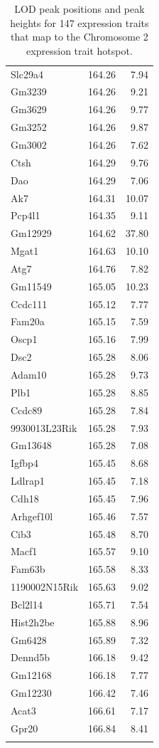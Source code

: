 \documentclass{article}
\begin{document}
\begin{longtable}{lrr}
  Slc29a4 & 164.26 & 7.94 \\ 
  Gm3239 & 164.26 & 9.21 \\ 
  Gm3629 & 164.26 & 9.77 \\ 
  Gm3252 & 164.26 & 9.87 \\ 
  Gm3002 & 164.26 & 7.62 \\ 
  Ctsh & 164.29 & 9.76 \\ 
  Dao & 164.29 & 7.06 \\ 
  Ak7 & 164.31 & 10.07 \\ 
  Pcp4l1 & 164.35 & 9.11 \\ 
  Gm12929 & 164.62 & 37.80 \\ 
  Mgat1 & 164.63 & 10.10 \\ 
  Atg7 & 164.76 & 7.82 \\ 
  Gm11549 & 165.05 & 10.23 \\ 
  Ccdc111 & 165.12 & 7.77 \\ 
  Fam20a & 165.15 & 7.59 \\ 
  Oscp1 & 165.16 & 7.99 \\ 
  Dsc2 & 165.28 & 8.06 \\ 
  Adam10 & 165.28 & 9.73 \\ 
  Plb1 & 165.28 & 8.85 \\ 
  Ccdc89 & 165.28 & 7.84 \\ 
  9930013L23Rik & 165.28 & 7.93 \\ 
  Gm13648 & 165.28 & 7.08 \\ 
  Igfbp4 & 165.45 & 8.68 \\ 
  Ldlrap1 & 165.45 & 7.18 \\ 
  Cdh18 & 165.45 & 7.96 \\ 
  Arhgef10l & 165.46 & 7.57 \\ 
  Cib3 & 165.48 & 8.70 \\ 
  Macf1 & 165.57 & 9.10 \\ 
  Fam63b & 165.58 & 8.33 \\ 
  1190002N15Rik & 165.63 & 9.02 \\ 
  Bcl2l14 & 165.71 & 7.54 \\ 
  Hist2h2be & 165.88 & 8.96 \\ 
  Gm6428 & 165.89 & 7.32 \\ 
  Dennd5b & 166.18 & 9.42 \\ 
  Gm12168 & 166.18 & 7.77 \\ 
  Gm12230 & 166.42 & 7.46 \\ 
  Acat3 & 166.61 & 7.17 \\ 
  Gpr20 & 166.84 & 8.41 \\ 
   \hline
  \caption{LOD peak positions and peak heights for 147 expression traits that map to the Chromosome 2 expression trait hotspot.}
  \label{tab:hot-annot}

\end{longtable}
\end{document}
